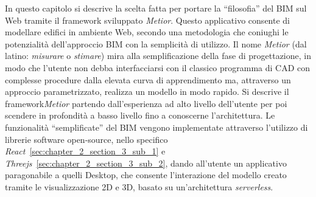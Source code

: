 In questo capitolo si descrive la scelta fatta per portare la ``filosofia'' del BIM sul Web tramite il framework sviluppato
\emph{Metior}.
Questo applicativo consente di modellare edifici in ambiente Web, secondo una metodologia che coniughi le potenzialità
dell’approccio BIM con la semplicità di utilizzo.
Il nome \emph{Metior} (dal latino: \emph{misurare} o \emph{stimare}) mira alla semplificazione della fase di progettazione,
in modo che l'utente non debba interfacciarsi con il classico programma
di CAD con complesse procedure dalla elevata curva di apprendimento ma, attraverso un approccio parametrizzato,
realizza un modello in modo rapido.
Si descrive il framework\emph{Metior} partendo dall'esperienza ad alto livello dell'utente per poi scendere in profondità
a basso livello fino a conoscerne l'architettura.
Le funzionalità ``semplificate'' del BIM vengono implementate attraverso l'utilizzo di librerie software open-source,
nello specifico \emph{React}~\ref{sec:chapter_2_section_3_sub_1}
 e \emph{Threejs}~\ref{sec:chapter_2_section_3_sub_2}, dando all'utente un applicativo paragonabile a quelli
Desktop, che consente l'interazione del modello creato tramite le visualizzazione 2D e 3D, basato su un'architettura \emph{serverless}.
\newpage

